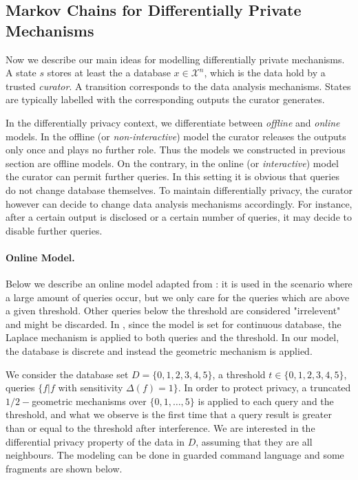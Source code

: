 \subsection{Markov Chains for Differentially Private Mechanisms}
Now we describe our main ideas for  modelling differentially private mechanisms.
A state $s$ stores at least the a database $x\in \mathcal{X}^n$, which is the data hold by a trusted \emph{curator}. A transition corresponds to the data analysis mechanisms.
States are typically labelled with the corresponding outputs
the curator generates.

In the differentially privacy context, we differentiate between \emph{offline} and \emph{online} models.
In the offline (or \emph{non-interactive}) model the curator releases the outputs only once and plays no further role. Thus the models we constructed in previous section are offline models. On the contrary, in the online (or \emph{interactive}) model the curator can permit further queries. In this setting it is obvious that queries do not change database themselves. To maintain differentially privacy, the curator however can decide to change data analysis mechanisms accordingly. For instance, after a certain output is disclosed or a certain number of queries, it may decide to disable further queries.


\paragraph{Online Model.}
Below we describe an online model adapted from \cite{}: it is used in the scenario where a large amount of queries occur, but we only care for the queries which
are above a given threshold. Other queries below the threshold are considered "irrelevent" and might be discarded. In \cite{}, since the model is set for continuous database, the Laplace mechanism is applied to both queries and the threshold. In our model, the database is discrete and instead the geometric mechanism is applied.

We consider the database set $D = \{0,1,2,3,4,5\}$, a threshold $t \in \{0,1,2,3,4,5\}$, queries $\{f| f $ with sensitivity $\Delta (f) = 1 \}$. In order to protect privacy, a truncated $1/2-$geometric mechanisms over $\{ 0, 1, \ldots, 5 \}$ is applied to each query and the threshold, and what we observe is the first time that a query result is greater than or equal to the threshold after interference. We are interested in the differential privacy property of the data in $D$, assuming that they are all neighbours. The modeling can be done in guarded command language and some fragments are shown below.


